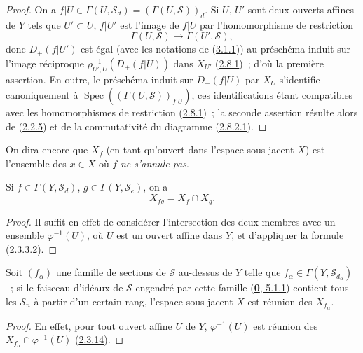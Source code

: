 \begin{proof}
On a $f|U\in\Gamma(U,\mathcal{S}_d)=(\Gamma(U,\mathcal{S}))_d$. Si $U$,
$U'$ sont deux ouverts affines de $Y$ tels que $U'\subset U$, $f|U'$ est
l'image de $f|U$ par l'homomorphisme de restriction
\[
  \Gamma(U,\mathcal{S})\longrightarrow\Gamma(U',\mathcal{S}),
\]
donc $D_+(f|U')$ est égal (avec les notations de
(\hyperref[II.3.1.1-fr]{3.1.1})) au préschéma induit sur l'image réciproque
$\rho_{U',U}^{-1}(D_+(f|U))$ dans $X_{U'}$
(\hyperref[II.2.8.1-fr]{2.8.1})~; d'où la première assertion. En outre, le
préschéma induit sur $D_+(f|U)$ par $X_U$ s'identifie canoniquement à
$\operatorname{Spec}((\Gamma(U,\mathcal{S}))_{f|U})$, ces identifications
étant compatibles avec les homomorphismes de restriction
(\hyperref[II.2.8.1-fr]{2.8.1})~; la seconde assertion résulte alors de
(\hyperref[II.2.2.5-fr]{2.2.5}) et de la commutativité du diagramme
(\hyperref[II.2.8.2.1-fr]{2.8.2.1}).
\end{proof}

On dira encore que $X_f$ (en tant qu'ouvert dans l'espace sous-jacent $X$)
est l'ensemble des $x\in X$ où $f$ \emph{ne s'annule pas}.

\begin{corollary}[3.1.5]
\label{II.3.1.5-fr}
Si $f\in\Gamma(Y,\mathcal{S}_d)$, $g\in\Gamma(Y,\mathcal{S}_e)$, on a
\[
\label{II.3.1.5.1-fr}
  X_{fg}=X_f\cap X_g.
\tag{3.1.5.1}
\]
\end{corollary}

\begin{proof}
Il suffit en effet de considérer l'intersection des deux membres avec un
ensemble $\varphi^{-1}(U)$, où $U$ est un ouvert affine dans $Y$, et
d'appliquer la formule (\hyperref[II.2.3.3.2-fr]{2.3.3.2}).
\end{proof}

\begin{corollary}[3.1.6]
\label{II.3.1.6-fr}
Soit $(f_\alpha)$ une famille de sections de $\mathcal{S}$ au-dessus de $Y$
telle que $f_\alpha\in\Gamma(Y,\mathcal{S}_{d_\alpha})$~; si le faisceau
d'idéaux de $\mathcal{S}$ engendré par cette famille
\textup{(\hyperref[0.5.1.1-fr]{\textbf{0}, 5.1.1})} contient tous les $\mathcal{S}_n$ à partir
d'un certain rang, l'espace sous-jacent $X$ est réunion des $X_{f_\alpha}$.
\end{corollary}

\begin{proof}
En effet, pour tout ouvert affine $U$ de $Y$, $\varphi^{-1}(U)$ est réunion
des $X_{f_\alpha}\cap\varphi^{-1}(U)$
(\hyperref[II.2.3.14-fr]{2.3.14}).
\end{proof}

